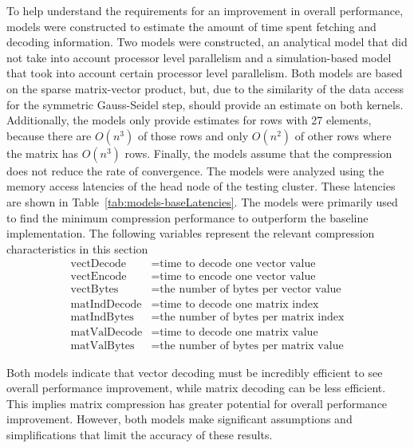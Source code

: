 
To help understand the requirements for an improvement in overall performance, models were constructed to estimate the amount of time spent fetching and decoding information.
Two models were constructed, an analytical model that did not take into account processor level parallelism and a simulation-based model that took into account certain processor level parallelism.
Both models are based on the sparse matrix-vector product, but, due to the similarity of the data access for the symmetric Gauss-Seidel step, should provide an estimate on both kernels.
Additionally, the models only provide estimates for rows with 27 elements, because there are \(O(n^3)\) of those rows and only \(O(n^2)\) of other rows where the matrix has \(O(n^3)\) rows.
Finally, the models assume that the compression does not reduce the rate of convergence.
The models were analyzed using the memory access latencies of the head node of the testing cluster.
These latencies are shown in Table~\ref{tab:models-baseLatencies}.
The models were primarily used to find the minimum compression performance to outperform the baseline implementation.
The following variables represent the relevant compression characteristics in this section
\begin{align*}
	\mathrm{vectDecode} &= \text{time to decode one vector value} \\
	\mathrm{vectEncode}  &= \text{time to encode one vector value} \\
	\mathrm{vectBytes} &= \text{the number of bytes per vector value} \\
	\mathrm{matIndDecode} &= \text{time to decode one matrix index} \\
	\mathrm{matIndBytes} &= \text{the number of bytes per matrix index} \\
	\mathrm{matValDecode} &= \text{time to decode one matrix value} \\
	\mathrm{matValBytes} &= \text{the number of bytes per matrix value}
\end{align*}



Both models indicate that vector decoding must be incredibly efficient to see overall performance improvement, while matrix decoding can be less efficient.
This implies matrix compression has greater potential for overall performance improvement.
However, both models make significant assumptions and simplifications that limit the accuracy of these results.

